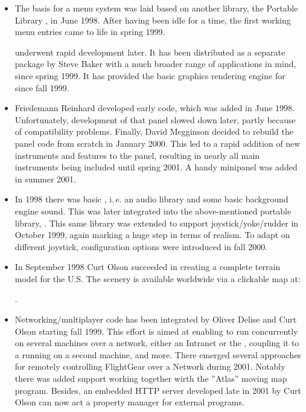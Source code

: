 \begin{itemize}
\item The basis for a menu system was laid based on another library,
 the Portable Library \PLIB{}, in June 1998. After having been idle for a time, the first
 working menu entries came to life in spring 1999.

  \PLIB{} underwent rapid development later. It has been distributed as a separate package by
  Steve Baker with a much broader range of applications in mind, since spring 1999. It
  has provided the basic graphics rendering engine for \FlightGear{} since fall 1999.

\item Friedemann Reinhard 
 developed early  code, which was added in June 1998. Unfortunately,
 development of that panel slowed down later, partly because of  compatibility
 problems. Finally, David Megginson  decided to rebuild the panel code from scratch in January 2000. This led to a rapid
  addition of new instruments and features to the panel, resulting in nearly all main
  instruments being included until spring 2001. A handy minipanel was added in summer 2001.

\item In 1998 there was basic , i.\,e. an audio library
and some basic background engine sound. This was later integrated into the
above-mentioned portable library, \PLIB{}. This same library was extended to
support joystick/yoke/rudder in October 1999, again marking a huge step
in terms of realism. To adapt on different joystick, configuration options were
introduced in fall 2000.

\item In September 1998 Curt Olson
 succeeded in creating a complete terrain model for the U.S. The
  scenery is available worldwide via a clickable map  at:
   \medskip

.
 \medskip

\item Networking/multiplayer
 code has been integrated by Oliver Delise  and Curt
Olson starting fall 1999. This effort is aimed at enabling
\FlightGear{}  to run concurrently on several machines over a network, either an Intranet
or the , coupling it to a  running on a second
machine, and more. There emerged several approaches for remotely controlling FlightGear over a Network during 2001. Notably there was added support working together wirth the ''Atlas'' moving map program. Besides, an embedded HTTP server developed late in 2001 by Curt Olson can now act a property manager for external programs.


\end{itemize}
